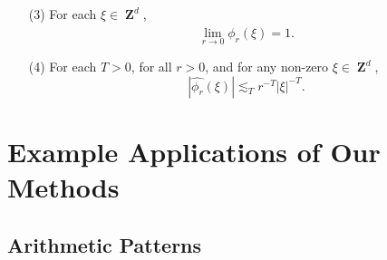 \documentclass[dvipsnames,letterpaper,12pt]{article}
\numberwithin{equation}{section}
\DeclareMathOperator{\ZZ}{\mathbf{Z}}
\DeclareMathOperator{\TT}{\mathbf{T}}
\numberwithin{theorem}{section}
\begin{document}
\begin{itemize}
\begin{enumerate}

    \item[(3)] For each $\xi \in \ZZ^d$,
    \begin{equation} \label{approximationtoidentitypointwiseconvergence}
        \lim_{r \to 0} \widehat{\phi_r}(\xi) = 1.
    \end{equation}

    \item[(4)] For each $T > 0$, for all $r > 0$, and for any non-zero $\xi \in \ZZ^d$,
    \begin{equation} \label{molificationdecaybound}
        |\widehat{\phi_r}(\xi)| \lesssim_T r^{-T} |\xi|^{-T}.
    \end{equation}
\end{enumerate}
\end{itemize}




\section{Example Applications of Our Methods}

\subsection{Arithmetic Patterns}
\end{document}

